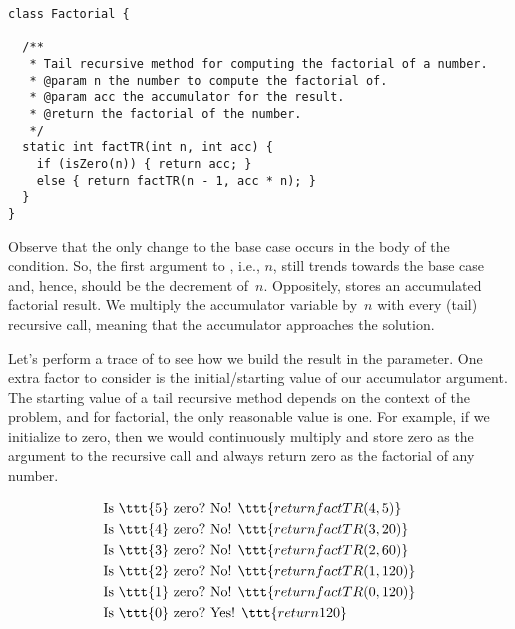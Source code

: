 \begin{lstlisting}[language=MyJava]
class Factorial {

  /**
   * Tail recursive method for computing the factorial of a number.
   * @param n the number to compute the factorial of.
   * @param acc the accumulator for the result.
   * @return the factorial of the number.
   */
  static int factTR(int n, int acc) {
    if (isZero(n)) { return acc; } 
    else { return factTR(n - 1, acc * n); }
  }
}
\end{lstlisting}

Observe that the only change to the base case occurs in the body of the condition. 
So, the first argument to , i.e., $n$, still trends towards the base case and, hence, should be the decrement of~$n$. 
Oppositely,  stores an accumulated factorial result. 
We multiply the accumulator variable by~$n$ with every (tail) recursive call, meaning that the accumulator approaches the solution.

Let's perform a trace of  to see how we build the result in the  parameter. 
One extra factor to consider is the initial/starting value of our accumulator argument. 
The starting value of a tail recursive method depends on the context of the problem, and for factorial, the only reasonable value is one. 
For example, if we initialize  to zero, then we would continuously multiply and store zero as the argument to the recursive call and always return zero as the factorial of any number.

\begin{align*}
    \text{Is }\ttt{5} \text{ zero?} &\text{ No! }\ttt{return factTR(4, 5)}\\
    \text{Is }\ttt{4} \text{ zero?} &\text{ No! }\ttt{return factTR(3, 20)}\\
    \text{Is }\ttt{3} \text{ zero?} &\text{ No! }\ttt{return factTR(2, 60)}\\
    \text{Is }\ttt{2} \text{ zero?} &\text{ No! }\ttt{return factTR(1, 120)}\\
    \text{Is }\ttt{1} \text{ zero?} &\text{ No! }\ttt{return factTR(0, 120)}\\
    \text{Is }\ttt{0} \text{ zero?} &\text{ Yes! }\ttt{return 120}
\end{align*}

